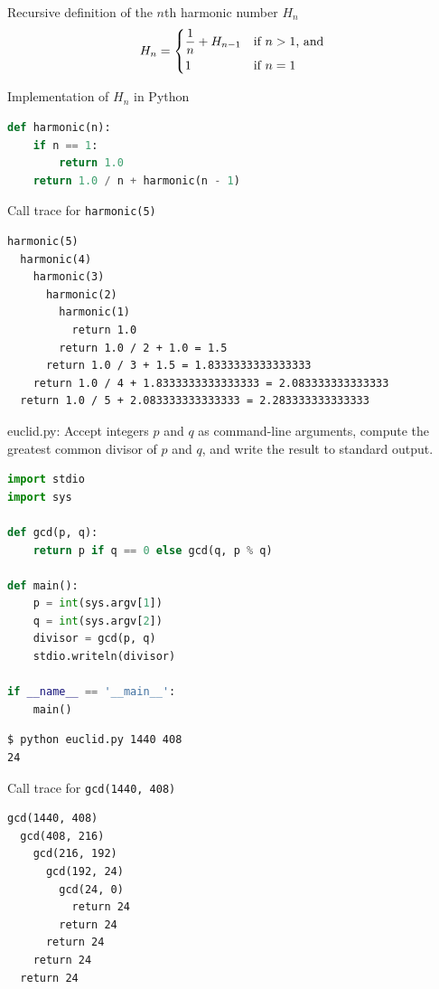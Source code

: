 \documentclass[8pt,a4paper,compress]{beamer}
\begin{document}
\begin{frame}[fragile]
\pause

Recursive definition of the $n$th harmonic number $H_n$
\[
H_n = \begin{dcases*}
\frac{1}{n} + H_{n-1} & if $n > 1$, and \\
1       & if $n=1$
\end{dcases*}
\]

\pause
\bigskip

Implementation of $H_n$ in Python
 
\begin{lstlisting}[language=Python]
def harmonic(n):
    if n == 1:
        return 1.0
    return 1.0 / n + harmonic(n - 1)
\end{lstlisting}

\pause
\bigskip

Call trace for \lstinline{harmonic(5)}
\begin{lstlisting}[language={}]
harmonic(5)
  harmonic(4)
    harmonic(3)
      harmonic(2)
        harmonic(1)
          return 1.0
        return 1.0 / 2 + 1.0 = 1.5
      return 1.0 / 3 + 1.5 = 1.8333333333333333
    return 1.0 / 4 + 1.8333333333333333 = 2.083333333333333
  return 1.0 / 5 + 2.083333333333333 = 2.283333333333333
\end{lstlisting}
\end{frame}

\begin{frame}[fragile]
\pause

\begin{framed}
\tiny euclid.py: Accept integers $p$ and $q$ as command-line arguments, compute the greatest common divisor of $p$ and $q$, and write the result to standard output.
\end{framed}

\begin{lstlisting}[language=Python]
import stdio
import sys

def gcd(p, q):
    return p if q == 0 else gcd(q, p % q) 

def main():
    p = int(sys.argv[1])
    q = int(sys.argv[2])
    divisor = gcd(p, q)
    stdio.writeln(divisor)

if __name__ == '__main__':
    main()
\end{lstlisting}

\pause

\begin{lstlisting}[language={}]
$ python euclid.py 1440 408
24
\end{lstlisting}

\pause

Call trace for \lstinline{gcd(1440, 408)}

\begin{lstlisting}[language={}]
gcd(1440, 408)
  gcd(408, 216)
    gcd(216, 192)
      gcd(192, 24)
        gcd(24, 0)
          return 24
        return 24
      return 24
    return 24
  return 24
\end{lstlisting}
\end{frame}
\end{document}
